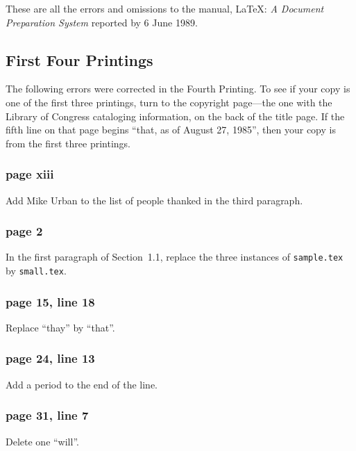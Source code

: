 
These are all the errors and omissions to the manual, \LaTeX: {\em A
Document Preparation System} reported by 6 June 1989.

\subsection{First Four Printings}

The following errors were corrected in the Fourth Printing.  To see if
your copy is one of the first three printings, turn to the copyright
page---the one with the Library of Congress cataloging information, on
the back of the title page.  If the fifth line on that page begins
``that, as of August 27, 1985'', then your copy is from the first three
printings.

\subsubsection*{page xiii}

Add Mike Urban to the list of people thanked in the third paragraph.

\subsubsection*{page 2}

In the first paragraph of Section~1.1, replace the three instances of
{\tt sample.tex} by {\tt small.tex}.

\subsubsection*{page 15, line 18}

Replace ``thay'' by ``that''.

\subsubsection*{page 24, line 13}
Add a period to the end of the line.

\subsubsection*{page 31, line 7}
Delete one ``will''.


